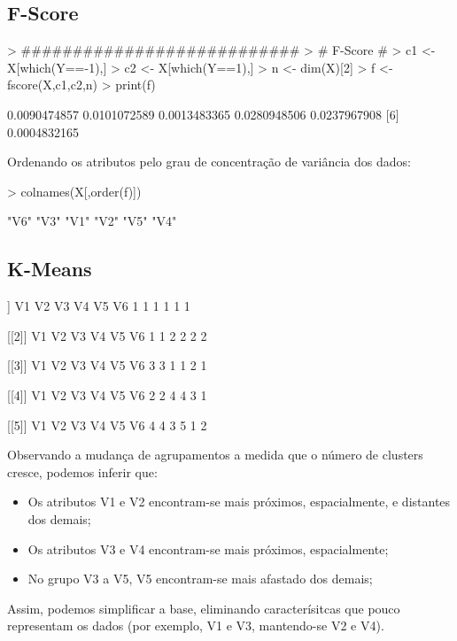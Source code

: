 \documentclass{article}
\begin{document}
\subsection{F-Score}
\begin{Schunk}
\begin{Sinput}
> ###########################
> # F-Score #
> c1 <- X[which(Y==-1),]
> c2 <- X[which(Y==1),]
> n <- dim(X)[2]
> f <- fscore(X,c1,c2,n)
> print(f)
\end{Sinput}
\begin{Soutput}
[1] 0.0090474857 0.0101072589 0.0013483365 0.0280948506 0.0237967908
[6] 0.0004832165
\end{Soutput}
\end{Schunk}
Ordenando os atributos pelo grau de concentração de variância dos dados:
\begin{Schunk}
\begin{Sinput}
> colnames(X[,order(f)])
\end{Sinput}
\begin{Soutput}
[1] "V6" "V3" "V1" "V2" "V5" "V4"
\end{Soutput}
\end{Schunk}
\subsection{K-Means}
\begin{Schunk}
\begin{Soutput}
[[1]]
V1 V2 V3 V4 V5 V6 
 1  1  1  1  1  1 

[[2]]
V1 V2 V3 V4 V5 V6 
 1  1  2  2  2  2 

[[3]]
V1 V2 V3 V4 V5 V6 
 3  3  1  1  2  1 

[[4]]
V1 V2 V3 V4 V5 V6 
 2  2  4  4  3  1 

[[5]]
V1 V2 V3 V4 V5 V6 
 4  4  3  5  1  2 
\end{Soutput}
\end{Schunk}
Observando a mudança de agrupamentos a medida que o número de clusters cresce, podemos inferir que:
\begin{itemize}
\item Os atributos V1 e V2 encontram-se mais próximos, espacialmente, e distantes dos demais;
\item Os atributos V3 e V4 encontram-se mais próximos, espacialmente;
\item No grupo V3 a V5, V5 encontram-se mais afastado dos demais;
\end{itemize}
Assim, podemos simplificar a base, eliminando caracterísitcas que pouco representam os dados (por exemplo, V1 e V3, mantendo-se V2 e V4).
\end{document}
